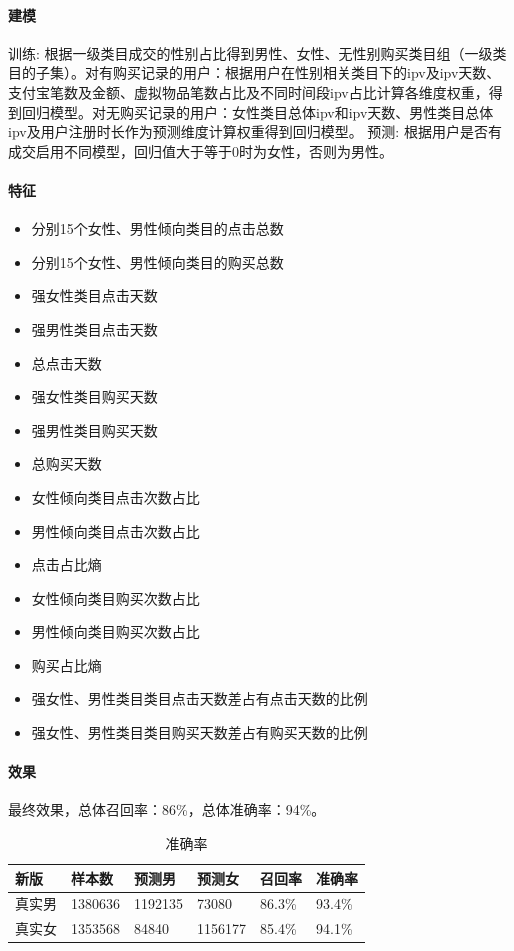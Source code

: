 	\paragraph{建模}
	训练:
	根据一级类目成交的性别占比得到男性、女性、无性别购买类目组（一级类目的子集）。对有购买记录的用户：根据用户在性别相关类目下的ipv及ipv天数、支付宝笔数及金额、虚拟物品笔数占比及不同时间段ipv占比计算各维度权重，得到回归模型。对无购买记录的用户：女性类目总体ipv和ipv天数、男性类目总体ipv及用户注册时长作为预测维度计算权重得到回归模型。
	预测:
	根据用户是否有成交启用不同模型，回归值大于等于0时为女性，否则为男性。
	\paragraph{特征}
	\begin{itemize}
	\item{分别15个女性、男性倾向类目的点击总数}
	\item{分别15个女性、男性倾向类目的购买总数}
	\item{强女性类目点击天数}
	\item{强男性类目点击天数}
	\item{总点击天数}
	\item{强女性类目购买天数}
	\item{强男性类目购买天数}
	\item{总购买天数}
	\item{女性倾向类目点击次数占比}
	\item{男性倾向类目点击次数占比}
	\item{点击占比熵}
	\item{女性倾向类目购买次数占比}
	\item{男性倾向类目购买次数占比}
	\item{购买占比熵}
	\item{强女性、男性类目类目点击天数差占有点击天数的比例}
	\item{强女性、男性类目类目购买天数差占有购买天数的比例}
	\end{itemize}
	\paragraph{效果}
	最终效果，总体召回率：86\%，总体准确率：94\%。
	\begin{table}
		\centering
		\caption{准确率}
		\begin{tabular}
			{|l|l|l|l|l|l|}
			\hline
			新版&样本数&预测男&预测女&召回率&准确率\\
			\hline
			真实男&1380636&1192135&73080&86.3\%&93.4\%\\
			\hline
			真实女&1353568&84840&1156177&85.4\%&94.1\%\\
			\hline
		\end{tabular}
		\label{性别准确率}
	\end{table}
